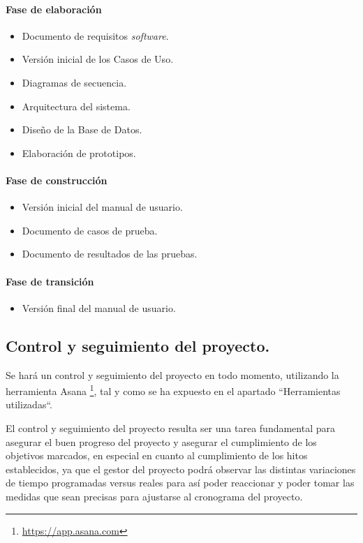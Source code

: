 \documentclass[twoside]{report}
\begin{document}
\paragraph{Fase de elaboración\\}
\begin{itemize}
\item Documento de requisitos \textit{software}.
\item Versión inicial de los Casos de Uso.
\item Diagramas de secuencia.
\item Arquitectura del sistema.
\item Diseño de la Base de Datos.
\item Elaboración de prototipos.
\end{itemize}

\paragraph{Fase de construcción\\}
\begin{itemize}
\item Versión inicial del manual de usuario.
\item Documento de casos de prueba.
\item Documento de resultados de las pruebas.
\end{itemize}

\paragraph{Fase de transición\\}
\begin{itemize}
\item Versión final del manual de usuario.
\end{itemize}

\subsection{Control y seguimiento del proyecto.}

Se hará un control y seguimiento del proyecto en todo momento, utilizando la herramienta Asana \footnote{\url{https://app.asana.com}}, tal y como se ha expuesto en el apartado “Herramientas utilizadas“.

El control y seguimiento del proyecto resulta ser una tarea fundamental para asegurar el buen progreso del proyecto y asegurar el cumplimiento de los objetivos marcados, en especial en cuanto al cumplimiento de los hitos establecidos, ya que el gestor del proyecto podrá observar las distintas variaciones de tiempo programadas versus reales para así poder reaccionar y poder tomar las medidas que sean precisas para ajustarse al cronograma del proyecto.
\end{document}
